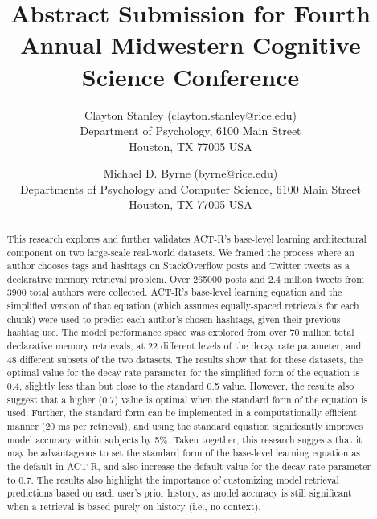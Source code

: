 \documentclass[english]{article}
\title{Abstract Submission for Fourth Annual Midwestern Cognitive Science Conference}
\author{Clayton Stanley (clayton.stanley@rice.edu) \\
  Department of Psychology, 6100 Main Street \\
  Houston, TX 77005 USA 
  \and Michael D. Byrne (byrne@rice.edu) \\
  Departments of Psychology and Computer Science, 6100 Main Street \\
  Houston, TX 77005 USA \\
}
\begin{document}
\maketitle

\begin{abstract}
  This research explores and further validates ACT-R's base-level learning architectural component on two large-scale real-world datasets.
  We framed the process where an author chooses tags and hashtags on StackOverflow posts and Twitter tweets as a declarative memory retrieval problem.
  Over \num{265000} posts and 2.4 million tweets from \num{3900} total authors were collected. 
  ACT-R's base-level learning equation and the simplified version of that equation (which assumes equally-spaced retrievals for each chunk) were used to predict each author's chosen hashtags, given their previous hashtag use.
  The model performance space was explored from over 70 million total declarative memory retrievals, at 22 different levels of the decay rate parameter, and 48 different subsets of the two datasets.
  The results show that for these datasets, the optimal value for the decay rate parameter for the simplified form of the equation is 0.4, slightly less than but close to the standard 0.5 value. 
  However, the results also suggest that a higher (0.7) value is optimal when the standard form of the equation is used.
  Further, the standard form can be implemented in a computationally efficient manner (20 ms per retrieval), and using the standard equation significantly improves model accuracy within subjects by 5\%.
  Taken together, this research suggests that it may be advantageous to set the standard form of the base-level learning equation as the default in ACT-R,
  and also increase the default value for the decay rate parameter to 0.7.
  The results also highlight the importance of customizing model retrieval predictions based on each user's prior history, as model accuracy is still significant when a retrieval is based purely on history (i.e., no context).
\end{abstract}
\end{document}

